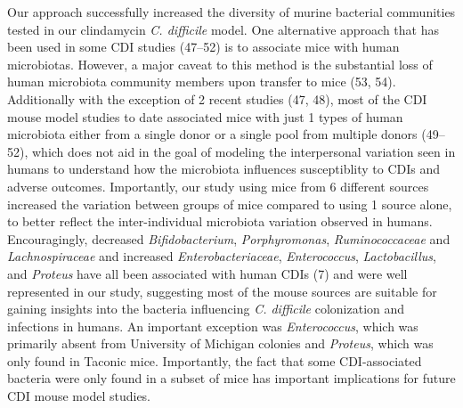\documentclass[
  11pt,
]{article}
\begin{document}
Our approach successfully increased the diversity of murine bacterial
communities tested in our clindamycin \emph{C. difficile} model. One
alternative approach that has been used in some CDI studies (47--52) is
to associate mice with human microbiotas. However, a major caveat to
this method is the substantial loss of human microbiota community
members upon transfer to mice (53, 54). Additionally with the exception
of 2 recent studies (47, 48), most of the CDI mouse model studies to
date associated mice with just 1 types of human microbiota either from a
single donor or a single pool from multiple donors (49--52), which does
not aid in the goal of modeling the interpersonal variation seen in
humans to understand how the microbiota influences susceptiblity to CDIs
and adverse outcomes. Importantly, our study using mice from 6 different
sources increased the variation between groups of mice compared to using
1 source alone, to better reflect the inter-individual microbiota
variation observed in humans. Encouragingly, decreased
\emph{Bifidobacterium}, \emph{Porphyromonas}, \emph{Ruminococcaceae} and
\emph{Lachnospiraceae} and increased \emph{Enterobacteriaceae},
\emph{Enterococcus}, \emph{Lactobacillus}, and \emph{Proteus} have all
been associated with human CDIs (7) and were well represented in our
study, suggesting most of the mouse sources are suitable for gaining
insights into the bacteria influencing \emph{C. difficile} colonization
and infections in humans. An important exception was
\emph{Enterococcus}, which was primarily absent from University of
Michigan colonies and \emph{Proteus}, which was only found in Taconic
mice. Importantly, the fact that some CDI-associated bacteria were only
found in a subset of mice has important implications for future CDI
mouse model studies.
\end{document}
